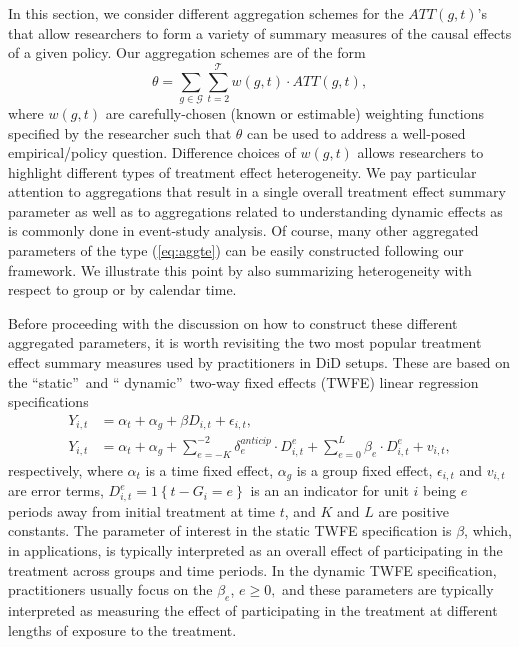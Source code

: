 \documentclass[11pt]{article}%
\theoremstyle{plain}
\numberwithin{sassumption}{section}
\numberwithin{equation}{section}
\begin{document}
In this section, we consider different aggregation schemes for the
$ATT(g,t)$'s that allow researchers to form a variety of summary measures of
the causal effects of a given policy. Our
aggregation schemes are of the form
\begin{equation}
	\theta=\sum_{g\in\mathcal{G}}\sum_{t=2}^{\mathcal{T}}w\left(  g,t\right)
	\cdot ATT(g,t), \label{eq:aggte}%
\end{equation}
where $w\left(  g,t\right)  $ are carefully-chosen (known or estimable) weighting functions
specified by the researcher such that $\theta$ can be used to address a
well-posed empirical/policy question.  Difference choices of $w\left(  g,t\right)$ allows researchers to highlight different types of treatment effect heterogeneity. We pay particular attention to aggregations that result in a single overall treatment effect summary parameter as well as to aggregations related to understanding dynamic effects as is commonly done in event-study analysis. Of course, many other aggregated parameters of the type (\ref{eq:aggte}) can be easily constructed following our framework. We illustrate this point by also summarizing heterogeneity with respect to group or by calendar time. 


Before proceeding with the discussion on how to construct these different
aggregated parameters, it is worth revisiting the two most popular treatment
effect summary measures used by practitioners in DiD setups. These are based
on the \textquotedblleft static\textquotedblright\ and \textquotedblleft
dynamic\textquotedblright\ two-way fixed effects (TWFE) linear regression
specifications%
\begin{align}
Y_{i,t}  &  =\alpha_{t}+\alpha_{g}+\beta D_{i,t}+\epsilon_{i,t}%
,\label{eq:TWFE}\\
Y_{i,t}  &  =\alpha_{t}+\alpha_{g}+\sum_{e=-K}^{-2}\delta_{e}^{anticip}\cdot
D_{i,t}^{e}+\sum_{e=0}^{L}\beta_{e}\cdot D_{i,t}^{e}+v_{i,t},
\label{eq:TWFE_dyn}%
\end{align}
respectively, where $\alpha_{t}$ is a time fixed effect, $\alpha_{g}$ is a
group fixed effect, $\epsilon_{i,t}$ and $v_{i,t}$ are error terms,
$D_{i,t}^{e}=1\left\{  t-G_{i}=e\right\}  $ is an an indicator for unit $i$
being $e$ periods away from initial treatment at time $t$, and $K$ and $L$ are
positive constants. The parameter of interest in the static TWFE specification
is $\beta$, which, in applications, is typically interpreted as an overall
effect of participating in the treatment across groups and time periods. In
the dynamic TWFE specification, practitioners usually focus on the $\beta_{e}%
$, $e\geq0,$ and these parameters are typically interpreted as measuring the effect of participating in the treatment at different lengths of exposure to the treatment.
\end{document}
